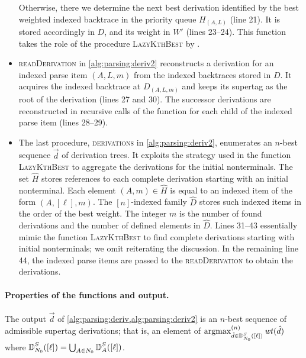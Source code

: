 \documentclass[../../document.tex]{subfiles}
\begin{document}
\begin{itemize}
            Otherwise, there we determine the next best derivation identified by the best weighted indexed backtrace in the priority queue \(H_{(A, L)}\) (line 21).
            It is stored accordingly in \(D\), and its weight in \(W'\) (lines 23--24).
            This function takes the role of the procedure \textsc{LazyKthBest} by .
        \item \textsc{readDerivation} in \cref{alg:parsing:deriv2} reconstructs a derivation for an indexed parse item \((A, L, m)\) from the indexed backtraces stored in \(D\).
            It acquires the indexed backtrace at \(D_{(A, L, m)}\) and keeps its supertag as the root of the derivation (lines 27 and 30).
            The successor derivations are reconstructed in recursive calls of the function for each child of the indexed parse item (lines 28--29).
        \item The last procedure, \textsc{derivations} in \cref{alg:parsing:deriv2}, enumerates an \(n\)-best sequence \(\vec{d}\) of derivation trees.
            It exploits the strategy used in the function \textsc{LazyKthBest} to aggregate the derivations for the initial nonterminals.
            The set \(\hat{H}\) stores references to each complete derivation starting with an initial nonterminal.
            Each element \((A, m) \in \hat{H}\) is equal to an indexed item of the form \((A, [\ell], m)\).
            The \([n]\)-indexed family \(\hat{D}\) stores such indexed items in the order of the best weight.
            The integer \(m\) is the number of found derivations and the number of defined elements in \(\hat{D}\).
            Lines 31--43 essentially mimic the function \textsc{LazyKthBest} to find complete derivations starting with initial nonterminals; we omit reiterating the discussion.
            In the remaining line 44, the indexed parse items are passed to the \textsc{readDerivation} to obtain the derivations.
    \end{itemize}

    \paragraph{Properties of the functions and output.}
    The output \(\vec{d}\) of \cref{alg:parsing:deriv,alg:parsing:deriv2} is an \(n\)-best sequence of admissible  supertag derivations; that is, an element of \(\operatorname{arg max}^{(n)}_{\hat{d} \in \operatorname{\mathbb{D}}^S_{N_0}([\ell])} \mathit{wt}(\hat{d})\) where \(\operatorname{\mathbb{D}}^S_{N_0}([\ell]) = \bigcup_{A \in N_0} \operatorname{\mathbb{D}}^S_{A}([\ell])\).
\end{document}
